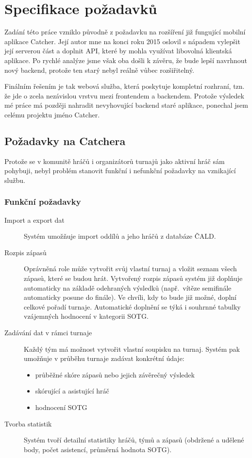 \chapter{Specifikace požadavků}

Zadání této práce vzniklo původně z požadavku na rozšíření již fungující mobilní aplikace Catcher.
Její autor mne na konci roku 2015 oslovil s nápadem vylepšit její serverou část a doplnit API,
které by mohla využívat libovolná klientská aplikace. Po rychlé analýze jsme však oba došli k závěru,
že bude lepší navrhnout nový backend, protože ten starý nebyl reálně vůbec rozšiřitelný. %

Finálním řešením je tak webová služba, která poskytuje kompletní rozhraní,
tzn. že jde o zcela nezávislou vrstvu mezi frontendem a backendem.
Protože výsledek mé práce má později nahradit nevyhovující backend staré aplikace, ponechal jsem celému projektu jméno Catcher.

\section{Požadavky na Catchera}

Protože se v komunitě hráčů i organizátorů turnajů jako aktivní hráč sám pohybuji,
nebyl problém stanovit funkční i nefunkční požadavky na vznikající službu.

\subsection{Funkční požadavky}

\begin{description}
  \item[Import a export dat]
    Systém umožňuje import oddílů a jeho hráčů z databáze ČALD.
  \item[Rozpis zápasů]
    Oprávněná role může vytvořit svůj vlastní turnaj a vložit seznam všech zápasů,
    které se budou hrát. Vytvořený rozpis zápasů systém již doplňuje automaticky na základě
    odehraných výsledků (např.~vítěze semifinále automaticky posune do finále). Ve chvíli,
    kdy to bude již možné, doplní celkové pořadí turnaje. Automatické doplnění se týká i 
    souhrnné tabulky vzájemných hodnocení v kategorii SOTG.
  \item[Zadávání dat v rámci turnaje]
    Každý tým má možnost vytvořit vlastní soupisku na turnaj. Systém pak umožňuje
    v průběhu turnaje zadávat konkrétní údaje:
    \begin{itemize}
      \item průběžné skóre zápasů nebo jejich závěrečný výsledek
      \item skórující a asistující hráč
      \item hodnocení SOTG
    \end{itemize}
  \item[Tvorba statistik]
    Systém tvoří detailní statistiky hráčů, týmů a zápasů (obdržené a udělené body,
    počet asistencí, průměrná hodnota SOTG).
\end{description}

